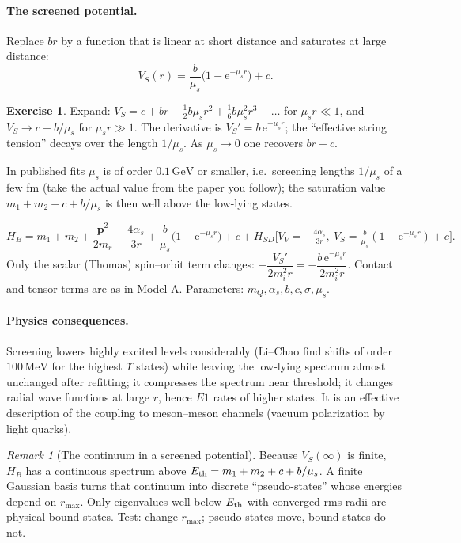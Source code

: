 \documentclass[11pt,a4paper]{article}
\numberwithin{equation}{section}
\theoremstyle{definition}
\newtheorem{exercise}[definition]{Exercise}
\theoremstyle{plain}
\theoremstyle{remark}
\newtheorem{remark}[definition]{Remark}
\newenvironment{keyresult}[1][Key result]{\begin{tcolorbox}[keybox,title={\small\bfseries #1},fonttitle=\small,coltitle=white,colbacktitle=MidnightBlue!70]}{\end{tcolorbox}}
\numberwithin{algorithm}{section}
\newcommand{\vp}{\bm p}
\newcommand{\as}{\alpha_s}
\newcommand{\ee}{\mathrm{e}}
\newcommand{\mr}{m_r}
\newcommand{\mus}{\mu_s}
\newcommand{\GeV}{\,\mathrm{GeV}}
\newcommand{\MeV}{\,\mathrm{MeV}}
\begin{document}
\paragraph{The screened potential.} Replace $br$ by a function that is linear at short distance and saturates at large distance:
\begin{equation}
V_S(r)=\frac{b}{\mus}\big(1-\ee^{-\mus r}\big)+c .
\label{eq:screen}
\end{equation}
\begin{exercise}
Expand: $V_S=c+br-\frac12b\mus r^2+\frac16b\mus^2r^3-\dots$ for $\mus r\ll1$, and $V_S\to c+b/\mus$ for $\mus r\gg1$. The derivative is $V_S'=b\,\ee^{-\mus r}$; the ``effective string tension'' decays over the length $1/\mus$. As $\mus\to0$ one recovers $br+c$.
\end{exercise}
In published fits $\mus$ is of order $0.1\GeV$ or smaller, i.e.\ screening lengths $1/\mus$ of a few fm (take the actual value from the paper you follow); the saturation value $m_1+m_2+c+b/\mus$ is then well above the low-lying states.

\begin{keyresult}[Model B]
\begin{equation}
H_B=m_1+m_2+\frac{\vp^2}{2\mr}-\frac{4\as}{3r}+\frac{b}{\mus}\big(1-\ee^{-\mus r}\big)+c+H_{SD}\Big[V_V=-\tfrac{4\as}{3r},\ V_S=\tfrac b{\mus}(1-\ee^{-\mus r})+c\Big].
\end{equation}
Only the scalar (Thomas) spin--orbit term changes: $-\dfrac{V_S'}{2m_i^2r}=-\dfrac{b\,\ee^{-\mus r}}{2m_i^2r}$. Contact and tensor terms are as in Model A.
Parameters: $m_Q,\as,b,c,\sigma,\mus$.
\end{keyresult}

\paragraph{Physics consequences.} Screening lowers highly excited levels considerably (Li--Chao find shifts of order $100\MeV$ for the highest $\Upsilon$ states) while leaving the low-lying spectrum almost unchanged after refitting; it compresses the spectrum near threshold; it changes radial wave functions at large $r$, hence $E1$ rates of higher states. It is an effective description of the coupling to meson--meson channels (vacuum polarization by light quarks).

\begin{remark}[The continuum in a screened potential]
Because $V_S(\infty)$ is finite, $H_B$ has a continuous spectrum above $E_{\rm th}=m_1+m_2+c+b/\mus$. A finite Gaussian basis turns that continuum into discrete ``pseudo-states'' whose energies depend on $r_{\max}$. Only eigenvalues well below $E_{\rm th}$ with converged rms radii are physical bound states. Test: change $r_{\max}$; pseudo-states move, bound states do not.
\end{remark}
\end{document}
